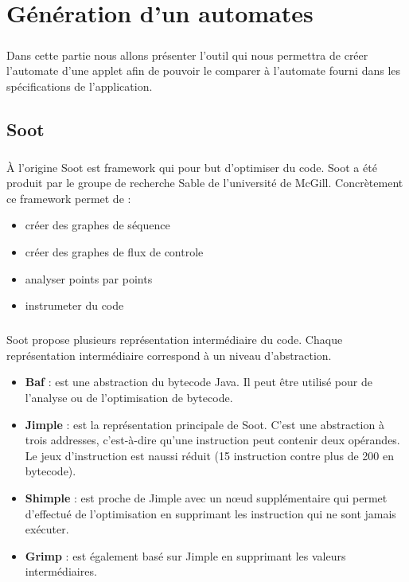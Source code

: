 \chapter{Génération d'un automates}

\paragraph{}
Dans cette partie nous allons présenter l'outil qui nous permettra de créer l'automate d'une applet afin de pouvoir le comparer à l'automate fourni dans les spécifications de l'application.

\section{Soot}

\paragraph{}
À l'origine Soot est framework qui pour but d'optimiser du code. Soot a été produit par le groupe de recherche Sable de l'université de McGill. Concrètement ce framework permet de :

\begin{itemize}
	\item créer des graphes de séquence
	\item créer des graphes de flux de controle
	\item analyser points par points
	\item instrumeter du code
\end{itemize}

\paragraph{}
Soot propose plusieurs représentation intermédiaire du code. Chaque représentation intermédiaire correspond à un niveau d'abstraction.
\begin{itemize}
	\item \textbf{Baf} : est une abstraction du bytecode Java. Il peut être utilisé pour de l'analyse ou de l'optimisation de bytecode.
	\item \textbf{Jimple} : est la représentation principale de Soot. C'est une abstraction à trois addresses, c'est-à-dire qu'une instruction peut contenir deux opérandes. Le jeux d'instruction est naussi réduit (15 instruction contre plus de 200 en bytecode).
	\item \textbf{Shimple} : est proche de Jimple avec un nœud supplémentaire qui permet d'effectué de l'optimisation en supprimant les instruction qui ne sont jamais exécuter.
	\item \textbf{Grimp} : est également basé sur Jimple en supprimant les valeurs intermédiaires.
\end{itemize}


\section{}

\paragraph{}